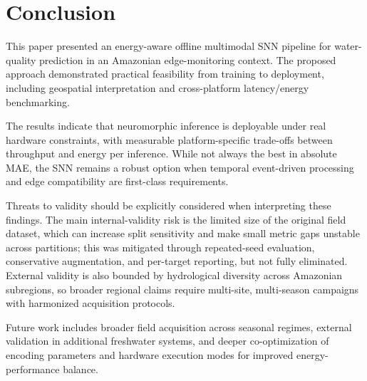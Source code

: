 \section{Conclusion}

This paper presented an energy-aware offline multimodal SNN pipeline for water-quality prediction in an Amazonian edge-monitoring context. The proposed approach demonstrated practical feasibility from training to deployment, including geospatial interpretation and cross-platform latency/energy benchmarking.

The results indicate that neuromorphic inference is deployable under real hardware constraints, with measurable platform-specific trade-offs between throughput and energy per inference. While not always the best in absolute MAE, the SNN remains a robust option when temporal event-driven processing and edge compatibility are first-class requirements.

Threats to validity should be explicitly considered when interpreting these findings. The main internal-validity risk is the limited size of the original field dataset, which can increase split sensitivity and make small metric gaps unstable across partitions; this was mitigated through repeated-seed evaluation, conservative augmentation, and per-target reporting, but not fully eliminated. External validity is also bounded by hydrological diversity across Amazonian subregions, so broader regional claims require multi-site, multi-season campaigns with harmonized acquisition protocols.

Future work includes broader field acquisition across seasonal regimes, external validation in additional freshwater systems, and deeper co-optimization of encoding parameters and hardware execution modes for improved energy-performance balance.
